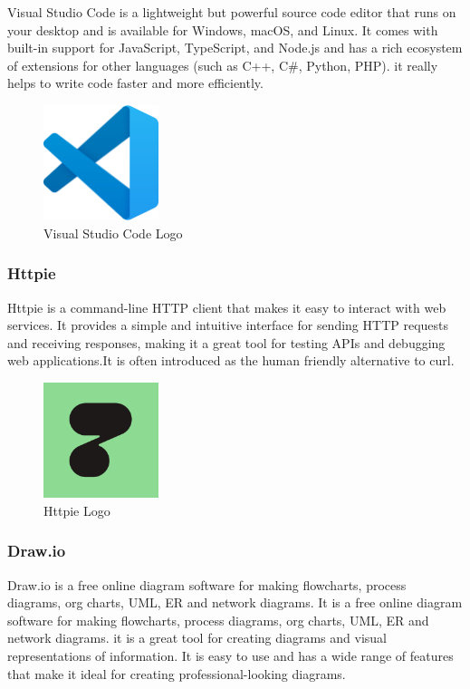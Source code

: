 Visual Studio Code is a lightweight but powerful source code editor that runs
on your desktop and is available for Windows, macOS, and Linux. It comes with
built-in support for JavaScript, TypeScript, and Node.js and has a rich
ecosystem of extensions for other languages (such as C++, C\#, Python, PHP). it really
helps to write code faster and more efficiently.
\begin{figure}[h!]
      \centering
      \includegraphics[width=0.3\textwidth]{images/vscode.png}
      \caption{Visual Studio Code Logo}
      \label{fig:vscode}
\end{figure}

\subsubsection{Httpie}

Httpie is a command-line HTTP client that makes it easy to interact with web
services. It provides a simple and intuitive interface for sending HTTP
requests and receiving responses, making it a great tool for testing APIs and
debugging web applications.It is often introduced as the human friendly alternative to curl.

\begin{figure}[h!]
      \centering
      \includegraphics[width=0.3\textwidth]{images/httpie.png}
      \caption{Httpie Logo}
      \label{fig:httpie}
\end{figure}

\subsubsection{Draw.io}
Draw.io is a free online diagram software for making flowcharts, process
diagrams, org charts, UML, ER and network diagrams. It is a free online diagram
software for making flowcharts, process diagrams, org charts, UML, ER and
network diagrams.
it is a great tool for creating diagrams and visual representations of
information. It is easy to use and has a wide range of features that make it
ideal for creating professional-looking diagrams.



